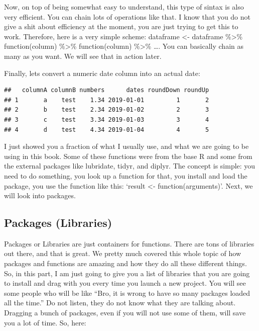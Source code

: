 \documentclass[]{book}
\newenvironment{Shaded}{\begin{snugshade}}{\end{snugshade}}
\newcommand{\CommentTok}[1]{\textcolor[rgb]{0.56,0.35,0.01}{\textit{#1}}}
\newcommand{\KeywordTok}[1]{\textcolor[rgb]{0.13,0.29,0.53}{\textbf{#1}}}
\newcommand{\NormalTok}[1]{#1}
\newcommand{\OperatorTok}[1]{\textcolor[rgb]{0.81,0.36,0.00}{\textbf{#1}}}
\newcommand{\StringTok}[1]{\textcolor[rgb]{0.31,0.60,0.02}{#1}}
\begin{document}
Now, on top of being somewhat easy to understand, this type of sintax is also very efficient. You can chain lots of operations like that. I know that you do not give a shit about efficiency at the moment, you are just trying to get this to work. Therefore, here is a very simple scheme: dataframe \textless{}- dataframe \%\textgreater{}\% function(column) \%\textgreater{}\% function(column) \%\textgreater{}\% \ldots{}. You can basically chain as many as you want. We will see that in action later.

Finally, lets convert a numeric date column into an actual date:

\begin{Shaded}
\end{Shaded}

\begin{verbatim}
##   columnA columnB numbers      dates roundDown roundUp
## 1       a    test    1.34 2019-01-01         1       2
## 2       b    test    2.34 2019-01-02         2       3
## 3       c    test    3.34 2019-01-03         3       4
## 4       d    test    4.34 2019-01-04         4       5
\end{verbatim}

I just showed you a fraction of what I usually use, and what we are going to be using in this book. Some of these functions were from the base R and some from the external packages like lubridate, tidyr, and diplyr. The concept is simple: you need to do something, you look up a function for that, you install and load the package, you use the function like this: `result \textless{}- function(arguments)'. Next, we will look into packages.

\hypertarget{packages-libraries}{%
\subsection{Packages (Libraries)}\label{packages-libraries}}

Packages or Libraries are just containers for functions. There are tons of libraries out there, and that is great. We pretty much covered this whole topic of how packages and functions are amazing and how they do all these different things. So, in this part, I am just going to give you a list of libraries that you are going to install and drag with you every time you launch a new project. You will see some people who will be like ``Bro, it is wrong to have so many packages loaded all the time.'' Do not listen, they do not know what they are talking about. Dragging a bunch of packages, even if you will not use some of them, will save you a lot of time. So, here:
\end{document}
